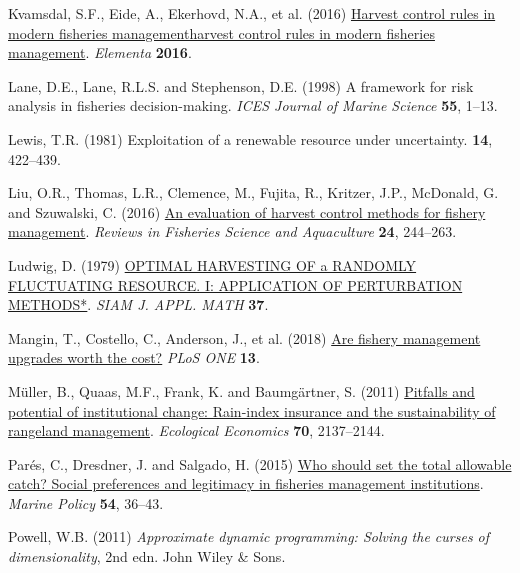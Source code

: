 \documentclass[
  letterpaper,
  DIV=11,
  numbers=noendperiod]{scrartcl}
\newlength{\cslhangindent}
\newlength{\cslentryspacingunit} %
\newenvironment{CSLReferences}[2] %
 {%
  \setlength{\parindent}{0pt}
  \ifodd #1
  \let\oldpar\par
  \def\par{\hangindent=\cslhangindent\oldpar}
  \fi
  \setlength{\parskip}{#2\cslentryspacingunit}
 }%
 {}
\begin{document}
\begin{CSLReferences}{1}{0}
\leavevmode{}%
Kvamsdal, S.F., Eide, A., Ekerhovd, N.A., et al. (2016)
\href{https://doi.org/10.12952/journal.elementa.000114}{Harvest control
rules in modern fisheries managementharvest control rules in modern
fisheries management}. \emph{Elementa} \textbf{2016}.

\leavevmode{}%
Lane, D.E., Lane, R.L.S. and Stephenson, D.E. (1998) A framework for
risk analysis in fisheries decision-making. \emph{ICES Journal of Marine
Science} \textbf{55}, 1--13.

\leavevmode{}%
Lewis, T.R. (1981) Exploitation of a renewable resource under
uncertainty. \textbf{14}, 422--439.

\leavevmode{}%
Liu, O.R., Thomas, L.R., Clemence, M., Fujita, R., Kritzer, J.P.,
McDonald, G. and Szuwalski, C. (2016)
\href{https://doi.org/10.1080/23308249.2016.1161002}{An evaluation of
harvest control methods for fishery management}. \emph{Reviews in
Fisheries Science and Aquaculture} \textbf{24}, 244--263.

\leavevmode{}%
Ludwig, D. (1979) \href{https://epubs.siam.org/terms-privacy}{OPTIMAL
HARVESTING OF a RANDOMLY FLUCTUATING RESOURCE. I: APPLICATION OF
PERTURBATION METHODS*}. \emph{SIAM J. APPL. MATH} \textbf{37}.

\leavevmode{}%
Mangin, T., Costello, C., Anderson, J., et al. (2018)
\href{https://doi.org/10.1371/journal.pone.0204258}{Are fishery
management upgrades worth the cost?} \emph{PLoS ONE} \textbf{13}.

\leavevmode{}%
Müller, B., Quaas, M.F., Frank, K. and Baumgärtner, S. (2011)
\href{https://doi.org/10.1016/j.ecolecon.2011.06.011}{Pitfalls and
potential of institutional change: Rain-index insurance and the
sustainability of rangeland management}. \emph{Ecological Economics}
\textbf{70}, 2137--2144.

\leavevmode{}%
Parés, C., Dresdner, J. and Salgado, H. (2015)
\href{https://doi.org/10.1016/j.marpol.2014.12.011}{Who should set the
total allowable catch? Social preferences and legitimacy in fisheries
management institutions}. \emph{Marine Policy} \textbf{54}, 36--43.

\leavevmode{}%
Powell, W.B. (2011) \emph{Approximate dynamic programming: Solving the
curses of dimensionality}, 2nd edn. John Wiley \& Sons.


\end{CSLReferences}
\end{document}
